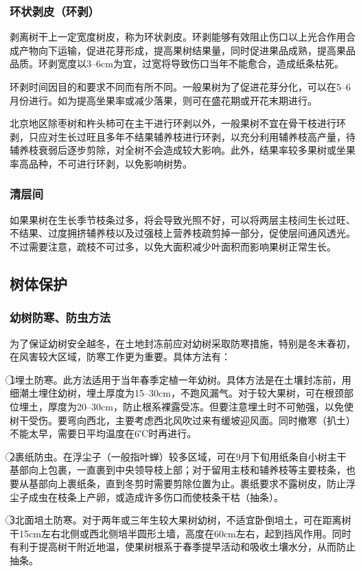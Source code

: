 \documentclass{ctexbook}
\begin{document}
\subsubsection{环状剥皮（环剥）}
剥离树干上一定宽度树皮，称为环状剥皮。环剥能够有效阻止伤口以上光合作用合成产物向下运输，促进花芽形成，提高果树结果量，同时促进果品成熟，提高果品品质。环剥宽度以3--6cm为宜，过宽将导致伤口当年不能愈合，造成纸条枯死。

环剥时间因目的和要求不同而有所不同。一般果树为了促进花芽分化，可以在5--6月份进行。如为提高坐果率或减少落果，则可在盛花期或开花末期进行。

北京地区除枣树和杵头柿可在主干进行环剥以外，一般果树不宜在骨干枝进行环剥，只应对生长过旺且多年不结果辅养枝进行环剥，以充分利用辅养枝高产量，待辅养枝衰弱后逐步剪除，对全树不会造成较大影响。此外，结果率较多果树或坐果率高品种，不可进行环剥，以免影响树势。
\subsubsection{清层间}
如果果树在生长季节枝条过多，将会导致光照不好，可以将两层主枝间生长过旺、不结果、过度拥挤辅养枝以及过强枝上营养枝疏剪掉一部分，促使层间通风透光。不过需要注意，疏枝不可过多，以免大面积减少叶面积而影响果树正常生长。
\subsection{树体保护}
\subsubsection{幼树防寒、防虫方法}
为了保证幼树安全越冬，在土地封冻前应对幼树采取防寒措施，特别是冬末春初，在风害较大区域，防寒工作更为重要。具体方法有：

\textcircled{1}埋土防寒。此方法适用于当年春季定植一年幼树。具体方法是在土壤封冻前，用细潮土埋住幼树，埋土厚度为15--30cm，不跑风漏气。对于较大果树，可在根颈部位埋土，厚度为20--30cm，防止根系裸露受冻。但要注意埋土时不可勉强，以免使树干受伤。要弯向西北，主要考虑西北风吹过来有缓坡迎风面。同时撤寒（扒土）不能太早，需要日平均温度在6℃时再进行。

\textcircled{2}裹纸防虫。在浮尘子（一般指叶蝉）较多区域，可在9月下旬用纸条自小树主干基部向上包裹，一直裹到中央领导枝上部；对于留用主枝和辅养枝等主要枝条，也要从基部向上裹纸条，直到冬剪时需要剪除位置为止。裹纸要求不露树皮，防止浮尘子成虫在枝条上产卵，或造成许多伤口而使枝条干枯（抽条）。

\textcircled{3}北面培土防寒。对于两年或三年生较大果树幼树，不适宜卧倒培土，可在距离树干15cm左右北侧或西北侧培半圆形土墙，高度在60cm左右，起到挡风作用。同时有利于提高树干附近地温，使果树根系于春季提早活动和吸收土壤水分，从而防止抽条。
\end{document}
